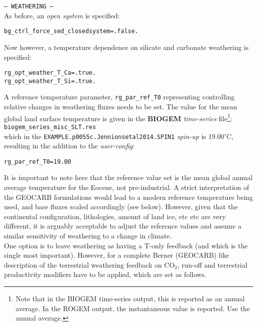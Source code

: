 \documentclass[10pt,twoside]{article}
\begin{document}
\begin{compactitem}
                \item \texttt{--- WEATHERING ---}
                \\ As before, an \textit{open  system} is specified:
\vspace{-5pt}\begin{verbatim}
bg_ctrl_force_sed_closedsystem=.false.
                \end{verbatim}\vspace{-5pt}
                Now however, a temperature dependence on silicate and carbonate weathering is specified:
\vspace{-5pt}\begin{verbatim}
rg_opt_weather_T_Ca=.true.
rg_opt_weather_T_Si=.true.
                \end{verbatim}\vspace{-5pt}
A reference temperature parameter, \texttt{rg\_par\_ref\_T0} representing controlling relative changes in weathering fluxes needs to be set. The value for the mean global land surface temperature is given in the \textbf{BIOGEM} \textit{time-series} file\footnote{Note that in the BIOGEM time-series output, this is reported as an annual average. In the ROGEM output, the instantaneous value is reported. Use the annual average.}:
\\\texttt{biogem\_series\_misc\_SLT.res}
\\which in the \texttt{EXAMPLE.p0055c.Jennionsetal2014.SPIN1} \textit{spin-up} is 19.00$^{\circ}$C, resulting in the addition to the \textit{user-config}:
\vspace{-5pt}\begin{verbatim}
rg_par_ref_T0=19.00
                \end{verbatim}\vspace{-5pt}
                It is important to note here that the reference value set is the mean global annual average temperature for the Eocene, not pre-industrial. A strict interpretation of the GEOCARB formulations would lead to a modern reference temperature being used, and base fluxes scaled accordingly (see below). However, given that the continental configuration, lithologies, amount of land ice, etc etc are very different, it is arguably acceptable to adjust the reference values and assume a similar sensitivity of weathering to a change in climate.
                                \\One option is to leave weathering as having a T-only feedback (and which is the single most important). However, for a complete Berner (GEOCARB) like description of the terrestrial weathering feedback on CO$_{2}$, run-off and terrestrial productivity modifiers have to be applied, which are set as follows.

\end{compactitem}
\end{document}
